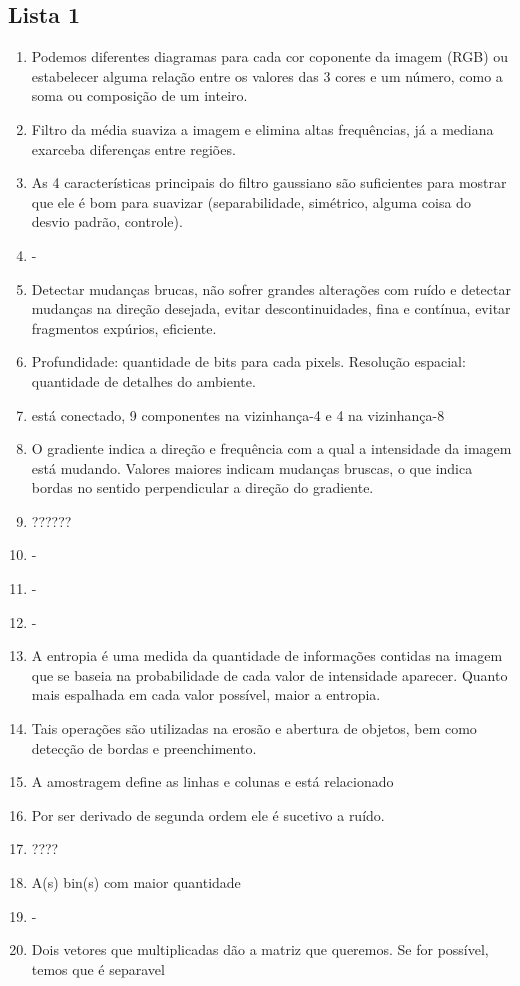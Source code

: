 \documentclass[twocolumn, 10pt]{article}
\begin{document}
\subsection*{Lista 1}
\label{sec:org0379fd6}
\begin{enumerate}
\item Podemos diferentes diagramas para cada cor coponente da imagem (RGB) ou estabelecer alguma relação entre os valores das 3 cores e um número, como a soma ou composição de um inteiro.
\item Filtro da média suaviza a imagem e elimina altas frequências, já a mediana exarceba diferenças entre regiões.
\item As 4 características principais do filtro gaussiano são suficientes para mostrar que ele é bom para suavizar (separabilidade, simétrico, alguma coisa do desvio padrão, controle).
\item -
\item Detectar mudanças brucas, não sofrer grandes alterações com ruído e detectar mudanças na direção desejada, evitar descontinuidades, fina e contínua, evitar fragmentos expúrios, eficiente.
\item Profundidade: quantidade de bits para cada pixels.
Resolução espacial: quantidade de detalhes do ambiente.
\item está conectado, 9 componentes na vizinhança-4 e 4 na vizinhança-8
\item O gradiente indica a direção e frequência com a qual a intensidade da imagem está mudando. Valores maiores indicam mudanças bruscas, o que indica bordas no sentido perpendicular a direção do gradiente.
\item ??????
\item -
\item -
\item -
\item A entropia é uma medida da quantidade de informações contidas na imagem que se baseia na probabilidade de cada valor de intensidade aparecer. Quanto mais espalhada em cada valor possível, maior a entropia.
\item Tais operações são utilizadas na erosão e abertura de objetos, bem como detecção de bordas e preenchimento.
\item A amostragem define as linhas e colunas e está relacionado
\item Por ser derivado de segunda ordem ele é sucetivo a ruído.
\item ????
\item A(s) bin(s) com maior quantidade
\item -
\item Dois vetores que multiplicadas dão a matriz que queremos. Se for possível, temos que é separavel
\end{enumerate}
\end{document}
